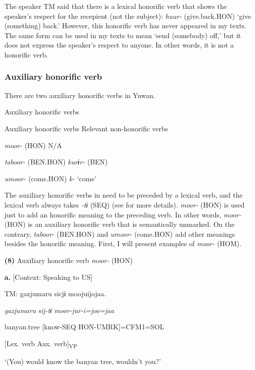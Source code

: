   The speaker TM said that there is a lexical honorific verb that shows the speaker’s respect for the recepient (not the subject): \textit{huur-} (give.back.HON) ‘give (something) back.’ However, this honorific verb has never appeared in my texts. The same form can be used in my texts to mean ‘send (somebody) off,’ but it does not express the speaker’s respect to anyone. In other words, it is not a honorific verb.

\subsubsection{Auxiliary honorific verb}

There are two auxiliary honorific verbs in Yuwan.

\begin{styleBeschriftung}
\textmd{}\textmd{ Auxiliary honorific verbs}
\end{styleBeschriftung}

Auxiliary honorific verbs  Relevant non-honorific verbs

\textit{moor-} (HON)  N/A

\textit{taboor-} (BEN.HON)  \textit{kurɨr-} (BEN)

\textit{umoor-} (come.HON)  \textit{k-} ‘come’

The auxiliary honorific verbs in  need to be preceded by a lexical verb, and the lexical verb always takes \textit{{}-tɨ} (SEQ) (see  for more details). \textit{moor-} (HON) is used just to add an honorific meaning to the preceding verb. In other words, \textit{moor-} (HON) is an auxiliary honorific verb that is semantically unmarked. On the contrary, \textit{taboor-} (BEN.HON) and \textit{umoor-} (come.HON) add other meanings besides the honorific meaning. First, I will present examples of \textit{moor-} (HOM).

\textbf{(8)}  Auxiliary honorific verb \textit{moor-} (HON)

  \textbf{a.}  [Context: Speaking to US]

    TM:  gazjumaru  sicjɨ  moojuijojaa.

      \textit{gazjumaru}  \textit{sij-tɨ}  \textit{moor{}-jur-i=joo=jaa}

      banyan.tree  [know-SEQ  HON-UMRK]=CFM1=SOL

        [Lex. verb  Aux. verb]\textsubscript{VP}

      ‘(You) would know the banyan tree, wouldn’t you?’

